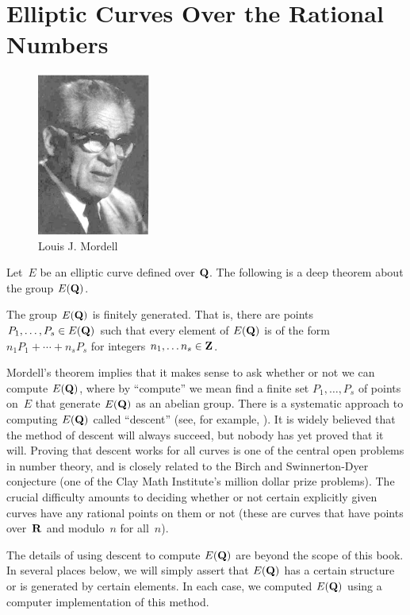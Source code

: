 \section{Elliptic Curves Over the Rational Numbers}
\label{sec:ellrat}
\begin{figure}
\begin{center}
\includegraphics[width=10em]{graphics/mordell}
\end{center}
\caption{Louis J. Mordell}
\end{figure}
Let~$E$ be an elliptic curve defined over $\mathbf{Q}$.  The following
is a deep theorem about the group $E(\mathbf{Q})$.
\begin{theorem}[Mordell]\label{thm:mordell}
The group $E(\mathbf{Q})$ is finitely generated.
That is, there are points $P_1,\ldots, P_s \in E(\mathbf{Q})$
such that every element of $E(\mathbf{Q})$ is of the form $n_1 P_1 + \cdots +
n_s P_s$ for integers $n_1, \ldots n_s\in\mathbf{Z}$.
\end{theorem}
Mordell's theorem implies that it makes sense to ask whether or not we
can compute $E(\mathbf{Q})$, where by ``compute'' we mean find a finite set
$P_1,\ldots, P_s$ of points on~$E$ that generate $E(\mathbf{Q})$ as an abelian
group.  There is a systematic approach to computing $E(\mathbf{Q})$ called
``descent'' (see, for example, \cite{cremona:algs, mwrank,
  silverman:aec}).  It is widely believed that the method of descent
will always succeed, but nobody has yet proved that it will.  Proving
that descent works for all curves is one of the central open problems
in number theory, and is closely related to the Birch and
Swinnerton-Dyer conjecture (one of the Clay Math Institute's million
dollar prize problems).  The crucial difficulty amounts to deciding
whether or not certain explicitly given curves have any rational
points on them or not (these are curves that have points over~$\mathbf{R}$ and
modulo~$n$ for all~$n$).

The details of using descent to compute $E(\mathbf{Q})$ are beyond the scope
of this book. In several places below, we will simply assert that
$E(\mathbf{Q})$ has a certain structure or is generated by certain elements.
In each case, we computed $E(\mathbf{Q})$ using a computer implementation of
this method.

